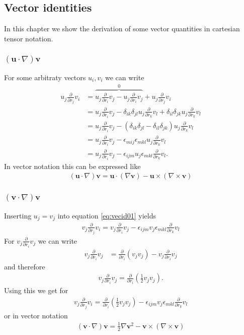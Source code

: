 \documentclass[12pt,a4paper,twoside]{book}
\renewcommand{\vec}[1]{\boldsymbol{#1}}
\newcommand{\lra}[1]{ \left( #1 \right) }
\newcommand{\pd}[1]{\frac{\partial}{\partial #1}}
\begin{document}
\subsection{Vector identities}
In this chapter we show the derivation of some vector quantities in cartesian
tensor notation.
\subsubsection{$(\vec{u}\cdot\nabla) \vec{v}$} \label{vecid01}
For some arbitraty vectors $u_i, v_i$ we can write
\begin{align*}
u_j \pd{r_j} v_i &= \overbrace{u_j \pd{r_i} v_j - u_j \pd{r_i} v_j}^0 
+ u_j\pd{r_j} v_i \\
&= u_j \pd{r_i} v_j - \delta_{ik}\delta_{jl} u_j \pd{r_k} v_l 
+\delta_{il}\delta_{jk} u_j \pd{r_k} v_l \\
&= u_j \pd{r_i} v_j 
- (\delta_{ik}\delta_{jl}-\delta_{il}\delta_{jk})u_j \pd{r_k} v_l \\
&= u_j \pd{r_i} v_j - \epsilon_{mij} \epsilon_{mkl} u_j \pd{r_k} v_l \\
&= u_j \pd{r_i} v_j - \epsilon_{ijm} u_j \epsilon_{mkl} \pd{r_k} v_l.
\end{align*}
In vector notation this can be expressed like
\begin{align}
(\vec{u}\cdot\nabla) \vec{v} = 
\vec{u}\cdot (\nabla \vec{v})-\vec{u} \times (\nabla \times \vec{v})
\label{eq:vecid01}
\end{align}
\subsubsection{$(\vec{v}\cdot\nabla) \vec{v}$}
Inserting $u_j=v_j$ into equation \eqref{eq:vecid01} yields
\begin{align*}
v_j \pd{r_j} v_i = v_j \pd{r_i} v_j 
- \epsilon_{ijm} v_j \epsilon_{mkl} \pd{r_k} v_l
\end{align*}
For $v_j \pd{r_i} v_j$ we can write
\begin{align*}
v_j \pd{r_i} v_j &= \pd{r_i} (v_j v_j) - v_j \pd{r_i} v_j
\end{align*}
and therefore
\begin{align*}
v_j \pd{r_i} v_j = \pd{r_i} \lra{\frac{1}{2} v_j v_j}.
\end{align*}
Using this we get for
\begin{align*}
v_j \pd{r_j} v_i = \pd{r_i} \lra{\frac{1}{2} v_j v_j}
- \epsilon_{ijm} v_j \epsilon_{mkl} \pd{r_k} v_l
\end{align*}
or in vector notation
\begin{align}
(\vec{v}\cdot\nabla) \vec{v} = 
\frac{1}{2} \nabla \vec{v}^2-\vec{v} \times (\nabla \times \vec{v})
\label{eq:vecid02}
\end{align}
\end{document}
